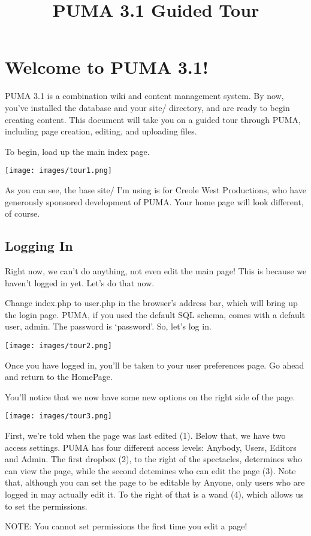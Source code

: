 \documentclass[12pt]{article}
\title{PUMA 3.1 Guided Tour}
\begin{document}
\section*{Welcome to PUMA 3.1!}


PUMA 3.1 is a combination wiki and content management system. By now, you've installed the database and your site/ directory, and are ready to begin creating content. This document will take you on a guided tour through PUMA, including page creation, editing, and uploading files.


 To begin, load up the main index page.
 
 \texttt{[image: images/tour1.png]} 


 As you can see, the base site/ I'm using is for Creole West Productions, who have generously sponsored development of PUMA. Your home page will look different, of course.
\subsection*{Logging In}


 Right now, we can't do anything, not even edit the main page! This is because we haven't logged in yet. Let's do that now.


 Change index.php to user.php in the browser's address bar, which will bring up the login page. PUMA, if you used the default SQL schema, comes with a default user, admin. The password is `password'. So, let's log in. 
 
 \texttt{[image: images/tour2.png]} 


 Once you have logged in, you'll be taken to your user preferences page. Go ahead and return to the HomePage.


 You'll notice that we now have some new options on the right side of the page.
 
 \texttt{[image: images/tour3.png]} 


 First, we're told when the page was last edited (1). Below that, we have two access settings. PUMA has four different access levels: Anybody, Users, Editors and Admin. The first dropbox (2), to the right of the spectacles, determines who can view the page, while the second detemines who can edit the page (3). Note that, although you can set the page to be editable by Anyone, only users who are logged in may actually edit it. To the right of that is a wand (4), which allows us to set the permissions.


 NOTE: You cannot set permissions the first time you edit a page!
\end{document}
